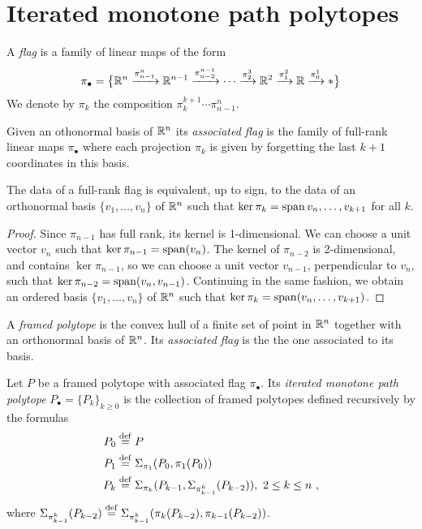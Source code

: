 
\section{Iterated monotone path polytopes}


\begin{definition}
	A \emph{flag} is a family of linear maps of the form
	\[
	\pi_\bullet = \big\{
	\mathbb{R}^n \xrightarrow{\pi^n_{n-1}} \mathbb{R}^{n-1} \xrightarrow{\pi^{n-1}_{n-2}} \dotsb \xrightarrow{\pi^3_{2}} \mathbb{R}^2 \xrightarrow{\pi^2_1} \mathbb{R} \xrightarrow{\pi^1_0} *
	\big\}
	\]
	We denote by $\pi_k$ the composition $\pi^{k+1}_{k}\cdots\pi^n_{n-1}$.
\end{definition}

Given an othonormal basis of $\mathbb{R}^n$ its \emph{associated flag} is the family of full-rank linear maps $\pi_\bullet$ where each projection $\pi_k$ is given by forgetting the last $k+1$ coordinates in this basis. 

\begin{lemma}
	The data of a full-rank flag is equivalent, up to sign, to the data of an orthonormal basis $\{v_1,\ldots,v_n\}$ of $\mathbb{R}^n$ such that $\ker \pi_k=\operatorname{\mathrm{span}}{v_n, \ldots, v_{k+1}}$ for all $k$.
\end{lemma}

\begin{proof}
	Since $\pi_{n-1}$ has full rank, its kernel is 1-dimensional.
	We can choose a unit vector $v_n$ such that $\ker \pi_{n-1} = \operatorname{\mathrm{span}}(v_n)$.
	The kernel of $\pi_{n-2}$ is 2-dimensional, and contains $\ker \pi_{n-1}$, so we can choose a unit vector $v_{n-1}$, perpendicular to $v_n$, such that $\ker \pi_{n-2}=\operatorname{\mathrm{span}}(v_n,v_{n-1})$.
	Continuing in the same fashion, we obtain an ordered basis $\{v_1,\ldots, v_n\}$ of $\mathbb{R}^n$ such that $\ker \pi_{k}=\operatorname{\mathrm{span}}(v_n,\ldots,v_{k+1})$.
\end{proof}

\begin{definition}
	A \textit{framed polytope} is the convex hull of a finite set of point in $\mathbb{R}^n$ together with an orthonormal basis of $\mathbb{R}^n$.
	Its \textit{associated flag} is the the one associated to its basis.
\end{definition}

\begin{definition}
	Let $P$ be a framed polytope with associated flag $\pi_\bullet$.
	Its \textit{iterated monotone path polytope} $P_\bullet = \{P_k\}_{k \geq 0}$ is the collection of framed polytopes defined recursively by the formulas
	\begin{align*}
		P_0 & \stackrel{\mathrm{def}}{=} P \\
		P_1 & \stackrel{\mathrm{def}}{=} \Sigma_{\pi_1}(P_0,\pi_1(P_0)) \\
		P_k & \stackrel{\mathrm{def}}{=} \Sigma_{\pi_k}(P_{k-1},\Sigma_{\pi^{k}_{k-1}}(P_{k-2})), \ 2 \leq k \leq n \ ,
	\end{align*}
	where $\Sigma_{\pi^{k}_{k-1}}(P_{k-2})\stackrel{\mathrm{def}}{=} \Sigma_{\pi^{k}_{k-1}}(\pi_k(P_{k-2}),\pi_{k-1}(P_{k-2}))$.
\end{definition}

